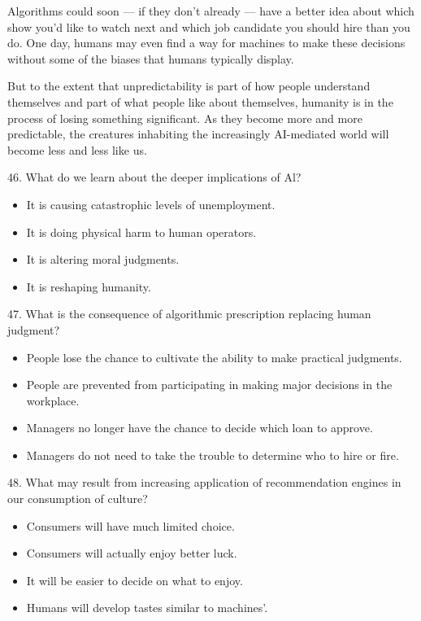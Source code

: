 \documentclass[UTF8,11pt]{ctexart}
\begin{document}
Algorithms could soon — if they don’t already — have a better idea about which show you’d like to watch next and which job candidate you should hire than you do. One day, humans may even find a way for machines to make these decisions without some of the biases that humans typically display.


But to the extent that unpredictability is part of how people understand themselves and part of what people like about themselves, humanity is in the process of losing something significant. As they become more and more predictable, the creatures inhabiting the increasingly AI-mediated world will become less and less like us.


46. What do we learn about the deeper implications of Al?


\begin{itemize}[leftmargin=2em,itemsep=.2em,topsep=.4em]\item[A.] It is causing catastrophic levels of unemployment.
\item[B.] It is doing physical harm to human operators.
\item[C.] It is altering moral judgments.
\item[D.] It is reshaping humanity.
\end{itemize}

47. What is the consequence of algorithmic prescription replacing human judgment?


\begin{itemize}[leftmargin=2em,itemsep=.2em,topsep=.4em]\item[A.] People lose the chance to cultivate the ability to make practical judgments.
\item[B.] People are prevented from participating in making major decisions in the workplace.
\item[C.] Managers no longer have the chance to decide which loan to approve.
\item[D.] Managers do not need to take the trouble to determine who to hire or fire.
\end{itemize}

48. What may result from increasing application of recommendation engines in our consumption of culture?


\begin{itemize}[leftmargin=2em,itemsep=.2em,topsep=.4em]\item[A.] Consumers will have much limited choice.
\item[B.] Consumers will actually enjoy better luck.
\item[C.] It will be easier to decide on what to enjoy.
\item[D.] Humans will develop tastes similar to machines’.
\end{itemize}
\end{document}
